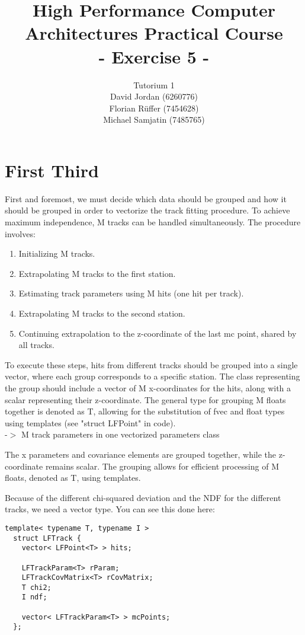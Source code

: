 \documentclass{article}
\title{\textbf{High Performance Computer Architectures Practical Course \\ - Exercise 5 -} \\[10mm]}
\author{Tutorium 1 \\[10mm] David Jordan (6260776) \\[1mm] Florian Rüffer (7454628) \\[1mm] Michael Samjatin (7485765) \\[10mm]}
\begin{document}
\maketitle
\newpage
\section{First Third}

First and foremost, we must decide which data should be
grouped and how it should be grouped in order to vectorize
the track fitting procedure.
To achieve maximum independence, M tracks can be handled simultaneously.
The procedure involves:

\begin{enumerate}
\item Initializing M tracks.
\item Extrapolating M tracks to the first station.
\item Estimating track parameters using M hits (one hit per track).
\item Extrapolating M tracks to the second station.
\item Continuing extrapolation to the z-coordinate of the last mc point, shared by all tracks.
\end{enumerate}

To execute these steps, hits from different tracks should be grouped
into a single vector, where each group corresponds to a specific station.
The class representing the group should include a vector of M x-coordinates
for the hits, along with a scalar representing their z-coordinate. The
general type for grouping M floats together is denoted as T, allowing
for the substitution of fvec and float types using templates
(see "struct LFPoint" in code).\\
-$>$ M track parameters in one vectorized parameters class

The x parameters and covariance elements
are grouped together, while the z-coordinate remains
scalar. The grouping allows for efficient processing
of M floats, denoted as T, using templates.

Because of the different chi-squared deviation and the
NDF for the different tracks, we need a vector type.
You can see this done here:\\
\begin{lstlisting}[caption=KFLineFitter.cpp]
  template< typename T, typename I >
  struct LFTrack {
    vector< LFPoint<T> > hits;
    
    LFTrackParam<T> rParam;
    LFTrackCovMatrix<T> rCovMatrix;
    T chi2;
    I ndf;
  
    vector< LFTrackParam<T> > mcPoints;
  };
\end{lstlisting}
\end{document}
